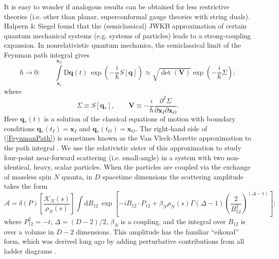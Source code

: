 It is easy to wonder if analogous results can be obtained for less restrictive theories (i.e. other than planar, superconformal gauge theories with string duals). Halpern \& Siegel \cite{HalpernSiegel} found that the (semiclassical) JWKB approximation of certain quantum mechanical systems (e.g. systems of particles) leads to a strong-coupling expansion. In nonrelativistic quantum mechanics, the semiclassical limit of the Feynman path integral gives
\begin{equation}
	\hbar \rightarrow 0: \qquad \int\limits_{\mathbf{x}_{I}}^{\mathbf{x}_{O}} \mathrm{D}\mathbf{q}(t) \, \exp{\left( - \frac{i}{\hbar} S[\mathbf{q}] \right)} \approx \sqrt{\det{(\mathbf{V})}} \exp{\left( - \frac{i}{\hbar} \Sigma \right)};
	\label{FeynmanPath}
\end{equation}
where
\begin{equation}
	\Sigma \equiv S[\mathbf{q}_{*}], \qquad \mathbf{V} \equiv - \frac{i}{\hbar} \frac{\partial^{2} \Sigma}{\partial \mathbf{x}_{I} \partial \mathbf{x}_{O}}.
\end{equation}
Here $\mathbf{q}_{*}(t)$ is a solution of the classical equations of motion with boundary conditions $\mathbf{q}_{*}(t_{I}) = \mathbf{x}_{I}$ and $\mathbf{q}_{*}(t_{O}) = \mathbf{x}_{O}$. The right-hand side of (\ref{FeynmanPath}) is sometimes known as the Van Vleck-Morette approximation to the path integral \cite{VanVleck,CartierMorette}. We use the relativistic sister of this approximation to study four-point near-forward scattering (i.e. small-angle) in a system with two non-identical, heavy, scalar particles. When the particles are coupled via the exchange of massless spin $N$ quanta, in $D$ spacetime dimensions the scattering amplitude takes the form
\begin{equation}
	\mathcal{A} = \delta(P) \left[ \frac{\mathcal{K}_{N}(s)}{\rho_{N}(s)} \right] \int \mathrm{d}B_{12} \, \exp{\left[ - i B_{12} \cdot P_{12} + \beta_{N} \rho_{N}(s) \Gamma(\Delta - 1) \left( \frac{2}{B_{12}^{2}} \right)^{(\Delta - 1)} \right]};
	\label{AmpMassless}
\end{equation}
where $P_{12}^{2} = -t$, $\Delta = (D - 2)/2$, $\beta_{N}$ is a coupling, and the integral over $B_{12}$ is over a volume in $D - 2$ dimensions. This amplitude has the familiar ``eikonal'' form, which was derived long ago by adding perturbative contributions from all ladder diagrams \cite{ChengWuPRL,AbarbItzyk,LevySucher1,ChangMa}.

